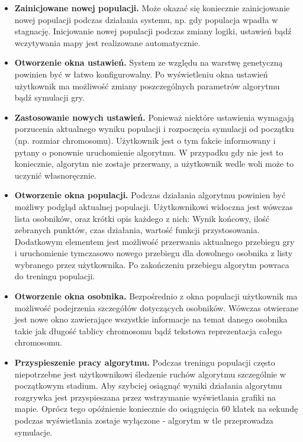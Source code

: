 \begin{itemize}
		\item {\bf Zainicjowane nowej populacji. }
		\newline
		Może okazać się koniecznie zainicjowanie nowej populacji podczas działania systemu, np. gdy populacja wpadła w stagnację.
		Inicjowanie nowej populacji podczas zmiany logiki, ustawień bądź wczytywania mapy jest realizowane automatycznie.
		\item {\bf Otworzenie okna ustawień.}
		\newline
		System ze względu na warstwę genetyczną powinien być w łatwo konfigurowalny. Po wyświetleniu okna ustawień użytkownik ma możliwość zmiany
		poszczególnych parametrów algorytmu bądź symulacji gry.
		\item {\bf Zastosowanie nowych ustawień. }
		\newline
		Ponieważ niektóre ustawienia wymagają porzucenia aktualnego wyniku populacji i rozpoczęcia symulacji od początku (np. rozmiar chromosomu).
		Użytkownik jest o tym fakcie informowany i pytany o ponownie uruchomienie algorytmu. 
		W przypadku gdy nie jest to koniecznie, algorytm nie zostaje przerwany, a użytkownik wedle woli może to uczynić własnoręcznie.
		\item {\bf Otworzenie okna populacji. }
		\newline
		Podczas działania algorytmu powinien być możliwy podgląd aktualnej populacji. Użytkownikowi widoczna jest wówczas lista osobników, oraz krótki opis każdego z nich:
		Wynik końcowy, ilość zebranych punktów, czas działania, wartość funkcji przystosowania. Dodatkowym elementem jest możliwość przerwania aktualnego przebiegu gry i uruchomienie tymczasowo nowego przebiegu dla dowolnego osobnika z listy wybranego przez użytkownika. Po zakończeniu przebiegu algorytm powraca do treningu populacji.
		\item {\bf Otworzenie okna osobnika. }
		\newline
		Bezpośrednio z okna populacji użytkownik ma możliwość podejrzenia szczegółów dotyczących osobników. Wówczas otwierane jest nowe okno zawierające wszystkie informacje na temat danego osobnika takie jak długość tablicy chromosomu bądź tekstowa reprezentacja całego chromosomu.		
		\item {\bf Przyspieszenie pracy algorytmu.}
		\newline
		Podczas treningu populacji często niepotrzebne jest użytkownikowi śledzenie ruchów algorytmu szczególnie w początkowym stadium. Aby szybciej osiągnąć wyniki działania algorytmu rozgrywka jest przyspieszana przez wstrzymanie wyświetlania grafiki na mapie. Oprócz tego opóźnienie koniecznie do osiągnięcia 60 klatek na sekundę podczas wyświetlania zostaje wyłączone - algorytm w tle przeprowadza symulacje.
	\end{itemize}
